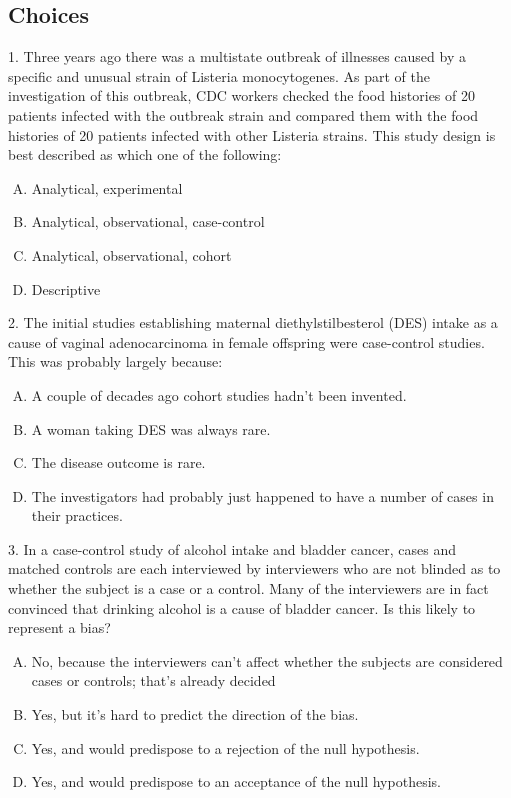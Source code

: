 \documentclass[11pt,a4paper]{article}
\begin{document}
\begin{CJK*}{UTF8}{gbsn}
\subsection{Choices}
1. Three years ago there was a multistate outbreak of illnesses caused by a specific and 
unusual strain of Listeria monocytogenes. As part of the investigation of this outbreak, 
CDC workers checked the food histories of 20 patients infected with the outbreak strain 
and compared them with the food histories of 20 patients infected with other Listeria 
strains. This study design is best described as which one of the following:
\begin{enumerate}[(A)]
  \item Analytical, experimental
  \item Analytical, observational, case-control
  \item Analytical, observational, cohort
  \item Descriptive
\end{enumerate}

2. The initial studies establishing maternal diethylstilbesterol (DES) intake as a 
cause of vaginal adenocarcinoma in female offspring were case-control studies. 
This was probably largely because:
\begin{enumerate}[(A)]
  \item A couple of decades ago cohort studies hadn't been invented.
  \item A woman taking DES was always rare.
  \item The disease outcome is rare.
  \item The investigators had probably just happened to have a number of cases in their practices.
\end{enumerate}


3. In a case-control study of alcohol intake and bladder cancer, cases and 
matched controls are each interviewed by interviewers who are not blinded 
as to whether the subject is a case or a control. Many of the interviewers 
are in fact convinced that drinking alcohol is a cause of bladder cancer. 
Is this likely to represent a bias?
\begin{enumerate}[(A)]
  \item No, because the interviewers can't affect whether the subjects are considered 
	cases or controls; that's already decided
  \item Yes, but it's hard to predict the direction of the bias.
  \item Yes, and would predispose to a rejection of the null hypothesis.
  \item Yes, and would predispose to an acceptance of the null hypothesis.
\end{enumerate}


\end{CJK*}
\end{document}
